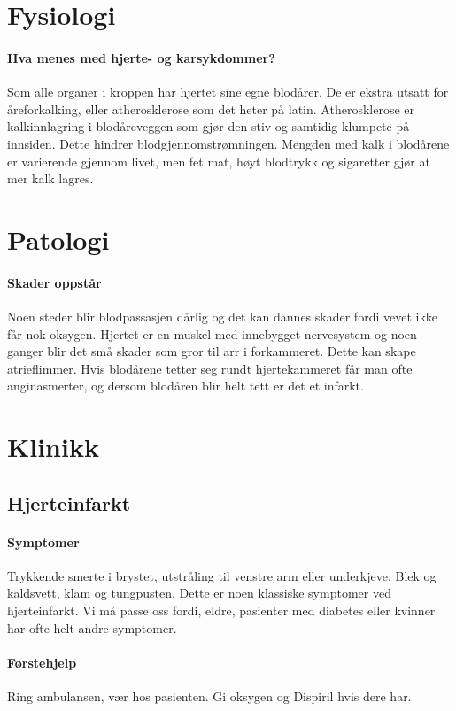 		\section{Fysiologi}	
			\paragraph{Hva menes med hjerte- og karsykdommer?\\}\label{sec:athero}
				Som alle organer i kroppen har hjertet sine egne blodårer. De er ekstra utsatt for åreforkalking, eller atherosklerose som det heter på latin. Atherosklerose er kalkinnlagring i blodåreveggen som gjør den stiv og samtidig klumpete på innsiden. Dette hindrer blodgjennomstrømningen. Mengden med kalk i blodårene er varierende gjennom livet, men fet mat, høyt blodtrykk og sigaretter gjør at mer kalk lagres. 
		\section{Patologi}	
			\paragraph{Skader oppstår\\}
				Noen steder blir blodpassasjen dårlig og det kan dannes skader fordi vevet ikke får nok oksygen. Hjertet er en muskel med innebygget nervesystem og noen ganger blir det små skader som gror til arr i forkammeret. Dette kan skape atrieflimmer\cite{!!!}. Hvis blodårene tetter seg rundt hjertekammeret får man ofte anginasmerter, og dersom blodåren blir helt tett er det et infarkt.
		\section{Klinikk}
			\subsection{Hjerteinfarkt}	
				\paragraph{Symptomer\\}
					Trykkende smerte i brystet, utstråling til venstre arm eller underkjeve. Blek og kaldsvett, klam og tungpusten. Dette er noen klassiske symptomer ved hjerteinfarkt. Vi må passe oss fordi, eldre, pasienter med diabetes eller kvinner har ofte helt andre symptomer. 
				\paragraph{Førstehjelp\\}
					Ring ambulansen, vær hos pasienten. Gi oksygen og Dispiril hvis dere har. 
